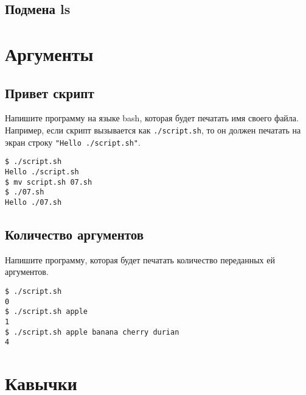 \documentclass{article}
\begin{document}
\subsection{Подмена ls}




\newpage
\section{Аргументы}

\subsection{Привет скрипт}
Напишите программу на языке bash, которая будет печатать имя своего файла. Например, если скрипт вызывается как \texttt{./script.sh}, то он должен печатать на экран строку  \texttt{"Hello ./script.sh"}.
\begin{lstlisting}
$ ./script.sh
Hello ./script.sh
$ mv script.sh 07.sh
$ ./07.sh
Hello ./07.sh
\end{lstlisting}

\subsection{Количество аргументов}
Напишите программу, которая будет печатать количество переданных ей аргументов.
\begin{lstlisting}
$ ./script.sh
0
$ ./script.sh apple
1
$ ./script.sh apple banana cherry durian
4
\end{lstlisting}




\section{Кавычки}
\end{document}
